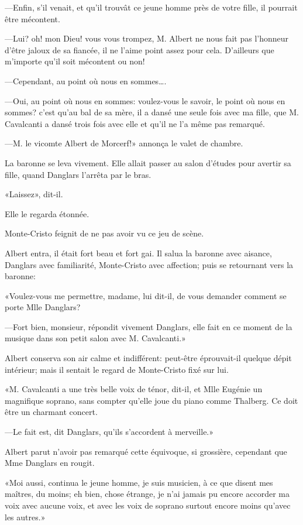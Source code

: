 —Enfin, s'il venait, et qu'il trouvât ce jeune homme près de votre fille, il pourrait être mécontent. 

—Lui? oh! mon Dieu! vous vous trompez, M. Albert ne nous fait pas l'honneur d'être jaloux de sa fiancée, il ne l'aime point assez pour cela. D'ailleurs que m'importe qu'il soit mécontent ou non! 

—Cependant, au point où nous en sommes\dots. 

—Oui, au point où nous en sommes: voulez-vous le savoir, le point où nous en sommes? c'est qu'au bal de sa mère, il a dansé une seule fois avec ma fille, que M. Cavalcanti a dansé trois fois avec elle et qu'il ne l'a même pas remarqué. 

—M. le vicomte Albert de Morcerf!» annonça le valet de chambre. 

La baronne se leva vivement. Elle allait passer au salon d'études pour avertir sa fille, quand Danglars l'arrêta par le bras. 

«Laissez», dit-il. 

Elle le regarda étonnée. 

Monte-Cristo feignit de ne pas avoir vu ce jeu de scène. 

Albert entra, il était fort beau et fort gai. Il salua la baronne avec aisance, Danglars avec familiarité, Monte-Cristo avec affection; puis se retournant vers la baronne: 

«Voulez-vous me permettre, madame, lui dit-il, de vous demander comment se porte Mlle Danglars? 

—Fort bien, monsieur, répondit vivement Danglars, elle fait en ce moment de la musique dans son petit salon avec M. Cavalcanti.» 

Albert conserva son air calme et indifférent: peut-être éprouvait-il quelque dépit intérieur; mais il sentait le regard de Monte-Cristo fixé sur lui. 

«M. Cavalcanti a une très belle voix de ténor, dit-il, et Mlle Eugénie un magnifique soprano, sans compter qu'elle joue du piano comme Thalberg. Ce doit être un charmant concert. 

—Le fait est, dit Danglars, qu'ils s'accordent à merveille.» 

Albert parut n'avoir pas remarqué cette équivoque, si grossière, cependant que Mme Danglars en rougit. 

«Moi aussi, continua le jeune homme, je suis musicien, à ce que disent mes maîtres, du moins; eh bien, chose étrange, je n'ai jamais pu encore accorder ma voix avec aucune voix, et avec les voix de soprano surtout encore moins qu'avec les autres.» 

